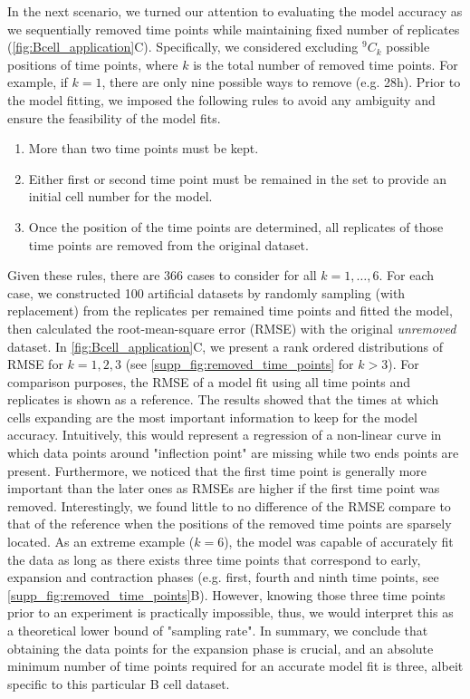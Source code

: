 \documentclass[11pt, a4paper]{article}
\newcommand*{\Comb}[2]{{}^{#1}C_{#2}}%
\begin{document}
In the next scenario, we turned our attention to evaluating the model accuracy as we sequentially removed time points while maintaining fixed number of replicates (\cref{fig:Bcell_application}C). Specifically, we considered excluding $\Comb{9}{k}$ possible positions of time points, where $k$ is the total number of removed time points. For example, if $k=1$, there are only nine possible ways to remove (e.g. 28h). Prior to the model fitting, we imposed the following rules to avoid any ambiguity and ensure the feasibility of the model fits.
\begin{enumerate}
    \item More than two time points must be kept.
    \item Either first or second time point must be remained in the set to provide an initial cell number for the model.
    \item Once the position of the time points are determined, all replicates of those time points are removed from the original dataset.
\end{enumerate}
Given these rules, there are 366 cases to consider for all $k=1,\dots,6$. For each case, we constructed 100 artificial datasets by randomly sampling (with replacement) from the replicates per remained time points and fitted the model, then calculated the root-mean-square error (RMSE) with the original \textit{unremoved} dataset. In \cref{fig:Bcell_application}C, we present a rank ordered distributions of RMSE for $k=1,2,3$ (see \cref{supp_fig:removed_time_points} for $k>3$). For comparison purposes, the RMSE of a model fit using all time points and replicates is shown as a reference. The results showed that the times at which cells expanding are the most important information to keep for the model accuracy. Intuitively, this would represent a regression of a non-linear curve in which data points around "inflection point" are missing while two ends points are present. Furthermore, we noticed that the first time point is generally more important than the later ones as RMSEs are higher if the first time point was removed. Interestingly, we found little to no difference of the RMSE compare to that of the reference when the positions of the removed time points are sparsely located. As an extreme example ($k=6$), the model was capable of accurately fit the data as long as there exists three time points that correspond to early, expansion and contraction phases (e.g. first, fourth and ninth time points, see \cref{supp_fig:removed_time_points}B). However, knowing those three time points prior to an experiment is practically impossible, thus, we would interpret this as a theoretical lower bound of "sampling rate". In summary, we conclude that obtaining the data points for the expansion phase is crucial, and an absolute minimum number of time points required for an accurate model fit is three, albeit specific to this particular B cell dataset.
\end{document}
